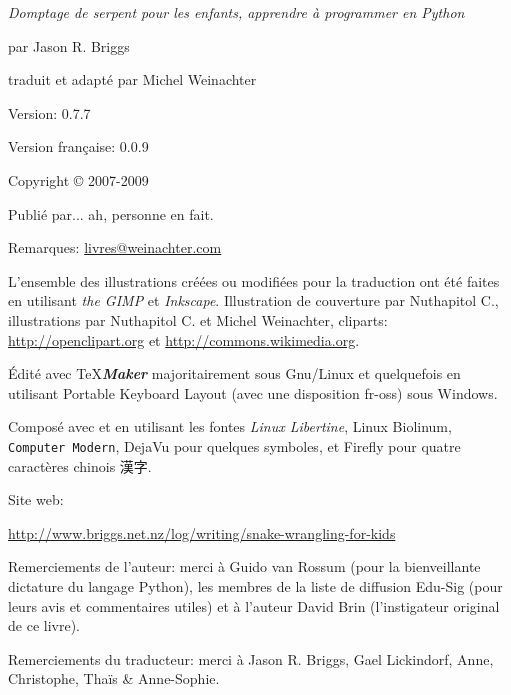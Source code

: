 \newpage

\textit{Domptage de serpent pour les enfants, apprendre à programmer en Python}

par Jason R. Briggs

traduit et adapté par Michel Weinachter

\bigskip
Version: 0.7.7

Version française: 0.0.9

\bigskip
Copyright © 2007-2009

\bigskip
Publié par... ah, personne en fait.

\bigskip
Remarques: \href{mailto:livres@weinachter.com?subject=Domptage de serpents pour les enfants}{livres@weinachter.com}

\bigskip
L'ensemble des illustrations créées ou modifiées pour la traduction ont été faites en utilisant \emph{the GIMP} et \emph{Inkscape}.
Illustration de couverture par Nuthapitol C., illustrations par Nuthapitol C. et Michel Weinachter, cliparts:
\url{http://openclipart.org} et \url{http://commons.wikimedia.org}. 

\bigskip
Édité avec \TeX{}{\textbf{\emph{Maker}}} majoritairement sous Gnu/Linux et quelquefois en utilisant Portable Keyboard Layout (avec une disposition fr-oss) sous Windows.
 
Composé avec \XeTeX{} et \XeLaTeX{} en utilisant les fontes \emph{Linux Libertine}, \textsf{Linux Biolinum}, \texttt{Computer Modern}, \setsansfont[Mapping=tex-text]{DejaVu Sans}\textsf{DejaVu} pour quelques symboles, et Firefly pour quatre caractères chinois {漢字}.%
 
\bigskip
Site web:

\url{http://www.briggs.net.nz/log/writing/snake-wrangling-for-kids}

\bigskip
Remerciements de l'auteur: merci à Guido van Rossum (pour la bienveillante dictature du langage Python), les membres de la liste de diffusion Edu-Sig (pour leurs avis et commentaires utiles) et à l'auteur David Brin (l'instigateur original de ce livre).

\bigskip
Remerciements du traducteur: merci à Jason R. Briggs, Gael Lickindorf, Anne, Christophe, Thaïs \& Anne-Sophie.

